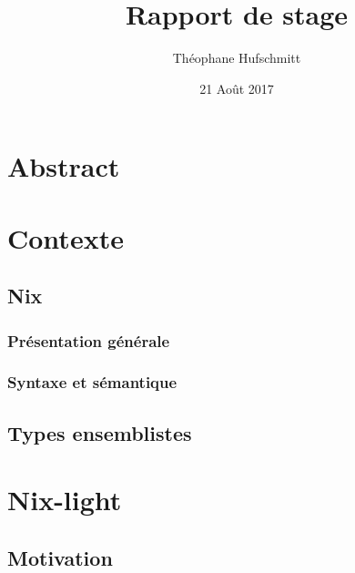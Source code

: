 \documentclass[frenchb]{scrartcl}
\title{Rapport de stage}
\author{Théophane Hufschmitt}
\date{21 Août 2017}
\newcommand{\τ}{\ensuremath{\tau}}
\begin{document}
\maketitle

\tableofcontents

\pagebreak

\section*{Abstract}

\section{Contexte}

\subsection{Nix}


\subsubsection{Présentation générale}


\subsubsection{Syntaxe et sémantique}


\subsection{Types ensemblistes}

\section{Nix-light} %
\label{sec:nix-light}

\subsection{Motivation}
\end{document}

